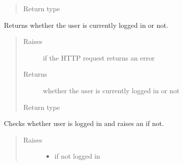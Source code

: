 \documentclass[letterpaper,10pt,english]{sphinxmanual}
\begin{document}
\begin{fulllineitems}
\begin{fulllineitems}
\begin{quote}
\begin{description}
\item[{Return type}] \leavevmode
{}

\end{description}\end{quote}

\end{fulllineitems}


\begin{fulllineitems}
\label{\detokenize{autoapi/pine/client/index:pine.client.PineClient.is_logged_in}}
Returns whether the user is currently logged in or not.
\begin{quote}\begin{description}
\item[{Raises}] \leavevmode
{\hyperref[\detokenize{autoapi/pine/client/exceptions/index:pine.client.exceptions.PineClientHttpException}]{}} \textendash{} if the HTTP request returns an error

\item[{Returns}] \leavevmode
whether the user is currently logged in or not

\item[{Return type}] \leavevmode
{}

\end{description}\end{quote}

\end{fulllineitems}


\begin{fulllineitems}
\label{\detokenize{autoapi/pine/client/index:pine.client.PineClient._check_login}}
Checks whether user is logged in and raises an {\hyperref[\detokenize{autoapi/pine/client/exceptions/index:pine.client.exceptions.PineClientAuthException}]{}} if not.
\begin{quote}\begin{description}
\item[{Raises}] \leavevmode\begin{itemize}
\item {} 
{\hyperref[\detokenize{autoapi/pine/client/exceptions/index:pine.client.exceptions.PineClientAuthException}]{}} \textendash{} if not logged in


\end{itemize}
\end{description}
\end{quote}
\end{fulllineitems}
\end{fulllineitems}
\end{document}
